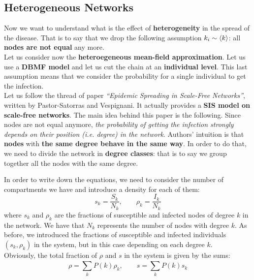 \documentclass[../main/main.tex]{subfiles}
\begin{document}


\subsection{Heterogeneous Networks}

Now we want to understand what is the effect of \textbf{heterogeneity} in the spread of the disease. That is to say that we drop the following assumption \( k_i \sim \expval{k}  \): all \textbf{nodes are not equal} any more.\\

Let us consider now the \textbf{heteroegeneous mean-field approximation}. Let us use a \textbf{DBMF model} and let us cut the chain at an \textbf{individual level}. This last assumption means that we consider the probability for a single individual to get the infection.\\
Let us follow the thread of paper \textit{“Epidemic Spreading in Scale-Free Networks”}, written by Pastor-Satorras and Vespignani. It actually provides a \textbf{SIS model on scale-free networks}. The main idea behind this paper is the following. Since nodes are not equal anymore, \textit{the probability of getting the infection strongly depends on their position (i.e. degree) in the network}. Authors' intuition is that \textbf{nodes} with \textbf{the same degree behave in the same way}. In order to do that, we need to divide the network in \textbf{degree classes}: that is to say we group together all the nodes with the same degree.

\medskip

In order to write down the equations, we need to consider the number of compartments we have and introduce a density for each of them:
\begin{equation*}
  s_k = \frac{S_k}{N_k}, \qquad \rho _k = \frac{I_k}{N_k}
\end{equation*}
where \( s_k \) and \( \rho _k \) are the fractions of susceptible and infected nodes of degree \( k \) in the network. We have that \( N_k \) represents the number of nodes with degree \( k \). As before, we introduced the fractions of susceptible and infected individuals $(s_k, \rho_k)$ in the system, but in this case depending on each degree \( k \).\\
Obviously, the total fraction of \( \rho  \) and \( s \) in the system is given by the sums:
\begin{equation}
  \rho = \sum_{k}^{} P(k) \rho _k, \qquad s = \sum_{k}^{} P(k) s_k
\end{equation}
\end{document}
